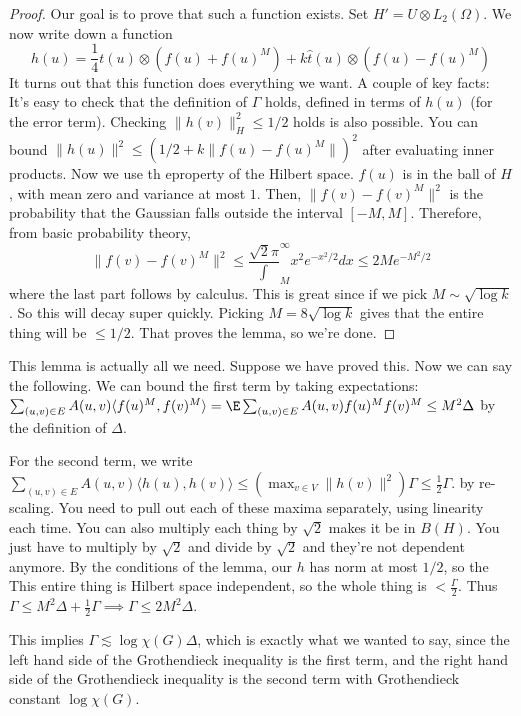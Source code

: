 \begin{df}
\begin{proof}
Our goal is to prove that such a function exists. Set $H' = U \otimes L_2(\Omega)$. We now write 
down a function 
\[
h(u) = \frac{1}{4}t(u) \otimes (f(u) + f(u)^M) + k\hat{t}(u) \otimes (f(u) - f(u)^M)
\]
It turns out that this function does everything we want. 
A couple of key facts: It's easy to check that the definition of $\Gamma$ holds, defined in terms of $h(u)$ (for the error term). Checking $\|h(v)\|_H^2 \leq 1/2$ holds is also possible. You can bound $\|h(u)\|^2 \leq (1/2 + k\|f(u) - f(u)^M\|)^2$ after evaluating inner products. Now we use th eproperty of the Hilbert space. $f(u)$ is in the ball of $H$, with mean zero and variance at most $1$. Then, $\|f(v) - f(v)^M\|^2$ is the probability that the Gaussian falls outside the interval $[-M, M]$. Therefore, from basic probability theory, 
\[
\|f(v) - f(v)^M\|^2 \leq \frac{\sqrt{2}{\pi}} \int_{M}^{\infty} x^2 e^{-x^2/2} dx \leq 2Me^{-M^2/2}
\]
where the last part follows by calculus. This is great since if we pick $M \sim \sqrt{\log k}$. So this will decay super quickly. Picking $M = 8\sqrt{\log k}$ gives that the entire thing will be $\leq 1/2$. That proves the lemma, so we're done.
\end{proof}

This lemma is actually all we need. Suppose we have proved this. Now we can say the following. We can bound the first term by taking expectations: 
$\sum_{(u, v) \in E} A(u, v)\langle f(u)^M, f(v)^M \rangle  = \E \sum_{(u, v) \in E} A(u, v)f(u)^Mf(v)^M \leq M^2 \Delta$ by the definition of $\Delta$. 

For the second term, we write $\sum_{(u, v) \in E} A(u, v)\langle h(u), h(v) \rangle \leq (\max_{v \in V} \|h(v)\|^2)\Gamma \leq \frac{1}{2}\Gamma$. 
by re-scaling. You need to pull out each of these maxima separately, using linearity each time. You can also multiply each thing by $\sqrt{2}$ makes it be in $B(H)$. You just have to multiply by $\sqrt{2}$ and divide by $\sqrt{2}$ and they're not dependent anymore. By the conditions of the lemma, our $h$ has norm at most $1/2$, so the 
This entire thing is Hilbert space independent, so the whole thing is $< \frac{\Gamma}{2}$. Thus $\Gamma \leq M^2\Delta + \frac{1}{2}\Gamma \implies \Gamma \leq 2M^2\Delta$. 

This implies $\Gamma \lesssim \log \chi(G)\Delta$, which is exactly what we wanted to say, since the left hand side of the Grothendieck inequality is the first term, and the right hand side of the Grothendieck inequality is the second term with Grothendieck constant $\log \chi(G)$. 


\end{df}
